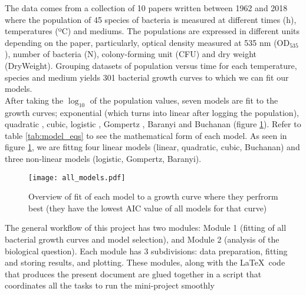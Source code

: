 \documentclass[titlepage,11pt]{article}
\begin{document}
\begin{linenumbers}
		The data comes from a collection of 10 papers written between 1962 and 2018 where the population of 45 species of bacteria is measured at different times (h), temperatures (ºC) and mediums.  The populations are expressed in different units depending on the paper, particularly,  optical density measured at 535 nm (OD$_{535} $), number of bacteria (N), colony-forming unit (CFU) and dry weight (DryWeight). Grouping datasets of population versus time for each temperature, species and medium yields 301 bacterial growth curves to which we can fit our models.\\
		After taking the $ \log_{10} $ of the population values, seven models are fit to the growth curves; exponential (which turns into linear after logging the population), quadratic , cubic, logistic \cite{Pearl1920, Verhulst1838}, Gompertz \cite{Zwietering1990}, Baranyi \cite{Baranyi1994} and Buchanan \cite{Buchanan1997} (figure \ref{all_models}). Refer to table \ref{tab:model_eqs} to see the mathematical form of each model. As seen in figure \ref{all_models}, we are fittng four linear models (linear, quadratic, cubic, Buchanan) and three non-linear models (logistic, Gompertz, Baranyi). \\
		\begin{figure}[h]
			\texttt{[image: all\_models.pdf]}
			\centering
			\caption{Overview of fit of each model to a growth curve where they perfrorm best (they have the lowest AIC value of all models for that curve)}
			\label{all_models}
		\end{figure}
		
		The general workflow of this project has two modules: Module 1 (fitting of all bacterial growth curves and model selection), and Module 2 (analysis of the biological question).  Each module has 3 subdivisions: data preparation, fitting and storing results, and plotting. These modules, along with the \LaTeX \ code that produces the present document are glued together in a script that coordinates all the tasks to run the mini-project smoothly

\end{linenumbers}
\end{document}
